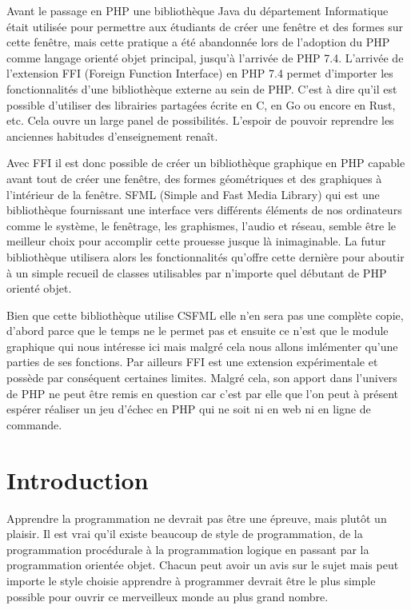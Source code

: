 \documentclass[11pt,a4paper,krantz2,11pt,oneside]{krantz}
\begin{document}
Avant le passage en PHP une bibliothèque Java du département Informatique était utilisée pour permettre aux étudiants de créer une fenêtre et des formes sur cette fenêtre, mais cette pratique a été abandonnée lors de l'adoption du PHP comme langage orienté objet principal, jusqu'à l'arrivée de PHP 7.4. L'arrivée de l'extension FFI (Foreign Function Interface) en PHP 7.4 permet d'importer les fonctionnalités d'une bibliothèque externe au sein de PHP. C'est à dire qu'il est possible d'utiliser des librairies partagées écrite en C, en Go ou encore en Rust, etc. Cela ouvre un large panel de possibilités. L'espoir de pouvoir reprendre les anciennes habitudes d'enseignement renaît.

Avec FFI il est donc possible de créer un bibliothèque graphique en PHP capable avant tout de créer une fenêtre, des formes géométriques et des graphiques à l'intérieur de la fenêtre. SFML (Simple and Fast Media Library) qui est une bibliothèque fournissant une interface vers différents éléments de nos ordinateurs comme le système, le fenêtrage, les graphismes, l'audio et réseau, semble être le meilleur choix pour accomplir cette prouesse jusque là inimaginable. La futur bibliothèque utilisera alors les fonctionnalités qu'offre cette dernière pour aboutir à un simple recueil de classes utilisables par n'importe quel débutant de PHP orienté objet.

Bien que cette bibliothèque utilise CSFML elle n'en sera pas une complète copie, d'abord parce que le temps ne le permet pas et ensuite ce n'est que le module graphique qui nous intéresse ici mais malgré cela nous allons imlémenter qu'une parties de ses fonctions. Par ailleurs FFI est une extension expérimentale et possède par conséquent certaines limites. Malgré cela, son apport dans l'univers de PHP ne peut être remis en question car c'est par elle que l'on peut à présent espérer réaliser un jeu d'échec en PHP qui ne soit ni en web ni en ligne de commande.

\hypertarget{intro}{%
\chapter*{Introduction}\label{intro}}


Apprendre la programmation ne devrait pas être une épreuve, mais plutôt un plaisir. Il est vrai qu'il existe beaucoup de style de programmation, de la programmation procédurale à la programmation logique en passant par la programmation orientée objet. Chacun peut avoir un avis sur le sujet mais peut importe le style choisie apprendre à programmer devrait être le plus simple possible pour ouvrir ce merveilleux monde au plus grand nombre.
\end{document}
